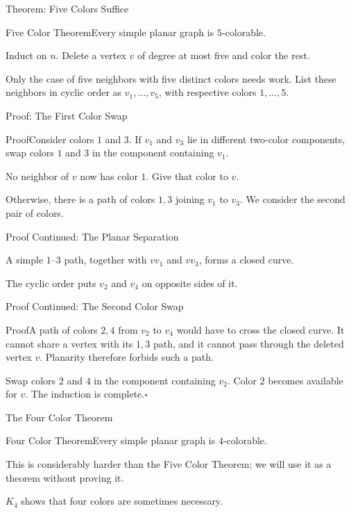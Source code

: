 \documentclass[aspectratio=169,11pt]{beamer}
\newcommand{\Thm}[2]{\begin{block}{#1}#2\end{block}}
\renewcommand{\Proof}[1]{\begin{block}{Proof}\normalsize #1\end{block}}
\newcommand{\gap}{\par\medskip}
\begin{document}
\begin{frame}{Theorem: Five Colors Suffice}
\large
\Thm{Five Color Theorem}{Every simple planar graph is $5$-colorable.}
\gap Induct on $n$. Delete a vertex $v$ of degree at most five and color the rest.
\gap Only the case of five neighbors with five distinct colors needs work. List these neighbors in cyclic order as $v_1,\ldots,v_5$, with respective colors $1,\ldots,5$.
\end{frame}
\begin{frame}{Proof: The First Color Swap}
\large
\Proof{Consider colors $1$ and $3$. If $v_1$ and $v_3$ lie in different two-color components, swap colors $1$ and $3$ in the component containing $v_1$.\gap No neighbor of $v$ now has color $1$. Give that color to $v$.\gap Otherwise, there is a path of colors $1,3$ joining $v_1$ to $v_3$. We consider the second pair of colors.}
\end{frame}
\begin{frame}{Proof Continued: The Planar Separation}
\large
\begin{center}\end{center}
A simple $1$--$3$ path, together with $vv_1$ and $vv_3$, forms a closed curve.
\gap The cyclic order puts $v_2$ and $v_4$ on opposite sides of it.
\end{frame}
\begin{frame}{Proof Continued: The Second Color Swap}
\large
\Proof{A path of colors $2,4$ from $v_2$ to $v_4$ would have to cross the closed curve. It cannot share a vertex with its $1,3$ path, and it cannot pass through the deleted vertex $v$. Planarity therefore forbids such a path.\gap Swap colors $2$ and $4$ in the component containing $v_2$. Color $2$ becomes available for $v$. The induction is complete.\hfill$\square$}
\end{frame}
\begin{frame}{The Four Color Theorem}
\large
\Thm{Four Color Theorem}{Every simple planar graph is $4$-colorable.}
\gap This is considerably harder than the Five Color Theorem; we will use it as a theorem without proving it.
\begin{center}\end{center}
$K_4$ shows that four colors are sometimes necessary.
\end{frame}
\end{document}
